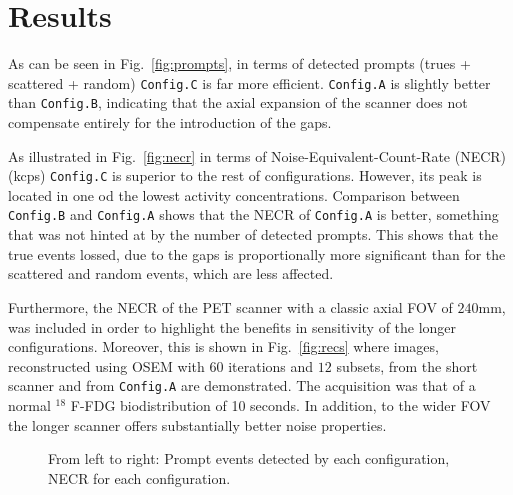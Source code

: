 \documentclass[journal]{IEEEtran}
\begin{document}
\section{Results}
As can be seen in Fig.~\ref{fig:prompts}, in terms of detected prompts (trues + scattered + random) \texttt{Config.C} is far more efficient. \texttt{Config.A} is slightly better than \texttt{Config.B}, indicating that the axial expansion of the scanner does not compensate entirely for the introduction of the gaps. 

As illustrated in Fig.~\ref{fig:necr} in terms of Noise-Equivalent-Count-Rate (NECR)(kcps) \texttt{Config.C} is superior to the rest of configurations. However, its peak is located in one od the lowest activity concentrations. Comparison between \texttt{Config.B} and \texttt{Config.A} shows that the NECR of \texttt{Config.A} is better, something that was not hinted at by the number of detected prompts. This shows that the true events lossed, due to the gaps is proportionally more significant than for the scattered and random events, which are less affected. 

Furthermore, the NECR of the PET scanner with a classic axial FOV of $240$mm, was included in order to highlight the benefits in sensitivity of the longer configurations. Moreover, this is shown in Fig.~\ref{fig:recs} where images, reconstructed using OSEM with $60$ iterations and $12$ subsets, from the short scanner and from \texttt{Config.A} are demonstrated. The acquisition was that of a normal $^{18}$ F-FDG biodistribution of 10 seconds. In addition, to the wider FOV the longer scanner offers substantially better noise properties. 

\begin{figure}
    \centering
    \caption{From left to right: Prompt events detected by each configuration, NECR for each configuration.}
\end{figure}
\end{document}

